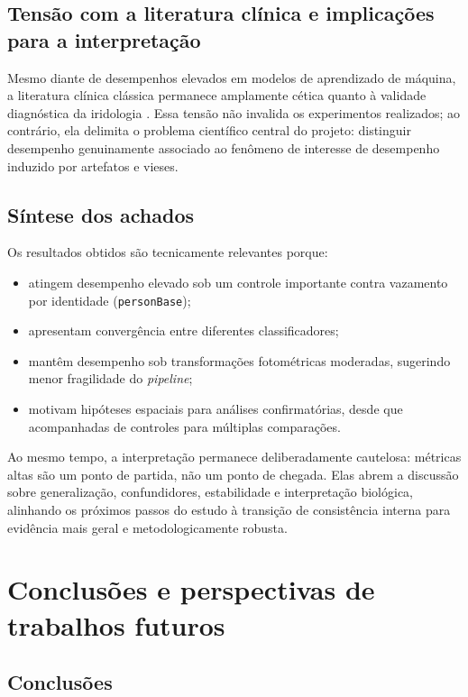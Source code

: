 \documentclass[11pt,a4paper]{article}
\begin{document}
\subsection{Tensão com a literatura clínica e implicações para a interpretação}
Mesmo diante de desempenhos elevados em modelos de aprendizado de máquina, a
literatura clínica clássica permanece amplamente cética quanto à validade
diagnóstica da iridologia
\citep{Simon1979JAMA, Ernst2000ArchOphthalmol, AusGovIridology2025}.
Essa tensão não invalida os experimentos realizados; ao contrário, ela delimita
o problema científico central do projeto: distinguir desempenho genuinamente
associado ao fenômeno de interesse de desempenho induzido por artefatos e vieses.

\subsection{Síntese dos achados}
Os resultados obtidos são tecnicamente relevantes porque:
\begin{itemize}
    \item atingem desempenho elevado sob um controle importante contra vazamento por identidade (\texttt{personBase});
    \item apresentam convergência entre diferentes classificadores;
    \item mantêm desempenho sob transformações fotométricas moderadas, sugerindo menor fragilidade do \textit{pipeline};
    \item motivam hipóteses espaciais para análises confirmatórias, desde que acompanhadas de controles para múltiplas comparações.
\end{itemize}

Ao mesmo tempo, a interpretação permanece deliberadamente cautelosa: métricas
altas são um ponto de partida, não um ponto de chegada. Elas abrem a discussão
sobre generalização, confundidores, estabilidade e interpretação biológica,
alinhando os próximos passos do estudo à transição de consistência interna para
evidência mais geral e metodologicamente robusta.

\section{Conclusões e perspectivas de trabalhos futuros}
\label{sec:conclusoes}

\subsection{Conclusões}
\end{document}
